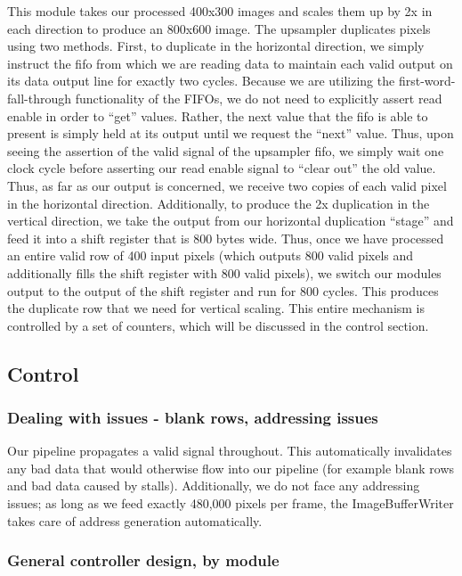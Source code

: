 This module takes our processed 400x300 images and scales them up by 2x in each
direction to produce an 800x600 image. The upsampler duplicates pixels using 
two methods. First, to duplicate in the horizontal direction, we simply instruct
the fifo from which we are reading data to maintain each valid output on its
data output line for exactly two cycles. Because we are utilizing the 
first-word-fall-through functionality of the FIFOs, we do not need to explicitly 
assert read enable in order to ``get'' values. Rather, the next value that the
fifo is able to present is simply held at its output until we request the ``next'' value.
Thus, upon seeing the assertion of the valid signal of the upsampler fifo, we simply
wait one clock cycle before asserting our read enable signal to ``clear out'' the old
value. Thus, as far as our output is concerned, we receive two copies of each valid
pixel in the horizontal direction. Additionally, to produce the 2x duplication
in the vertical direction, we take the output from our horizontal duplication ``stage''
and feed it into a shift register that is 800 bytes wide. Thus, once we have
processed an entire valid row of 400 input pixels (which outputs 800 valid pixels and 
additionally fills the shift register with 800 valid pixels), we switch our modules 
output to the output of the shift register and run for 800 cycles. This produces
the duplicate row that we need for vertical scaling. This entire mechanism is
controlled by a set of counters, which will be discussed in the control section.

\subsection{Control}

\subsubsection{Dealing with issues - blank rows, addressing issues}

Our pipeline propagates a valid signal throughout. This automatically invalidates
any bad data that would otherwise flow into our pipeline (for example blank rows
and bad data caused by stalls). Additionally, we do not face any addressing issues;
as long as we feed exactly 480,000 pixels per frame, the ImageBufferWriter takes
care of address generation automatically.

\subsubsection{General controller design, by module}

